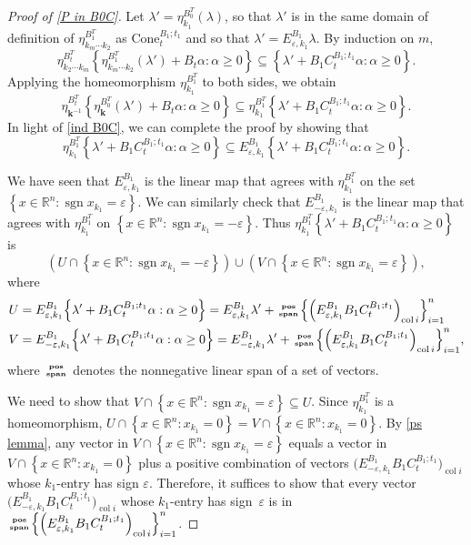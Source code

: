 \documentclass{amsart}
\theoremstyle{definition}
\theoremstyle{remark}
\numberwithin{equation}{section}
\newcommand{\reals}{\mathbb R}
\newcommand{\ep}{\varepsilon}
\newcommand{\col}{\operatorname{col}}
\newcommand{\sgn}{\operatorname{sgn}}
\newcommand{\posspan}{\!\!\tiny\begin{array}{c}\mathbf{pos}\\\mathbf{span}\end{array}\!\!}
\newcommand{\set}[1]{{\left\lbrace #1 \right\rbrace}}
\newcommand{\0}{{\mathbf{0}}}
\newcommand{\Cone}{\mathrm{Cone}}
\newcommand{\kk}{\mathbf{k}}
\begin{document}
\begin{proof}[Proof of \cref{P in B0C}]
Let $\lambda'=\eta_{k_1}^{B_0^T}(\lambda)$, so that $\lambda'$ is in the same domain of definition of $\eta_{k_m\cdots k_2}^{B_1^T}$ as $\Cone_t^{B_1;t_1}$ and so that $\lambda'=E^{B_1}_{\ep,k_1}\lambda$.
By induction on $m$, 
\[\eta_{k_2\cdots k_m}^{B_t^T}\set{\eta_{k_m\cdots k_2}^{B_1^T}(\lambda')+B_t\alpha:\alpha\ge0}\subseteq\set{\lambda'+B_1C_t^{B_1;t_1}\alpha:\alpha\ge0}.\]
Applying the homeomorphism $\eta_{k_1}^{B_1^T}$ to both sides, we obtain
\[\eta_{\kk^{-1}}^{B_t^T}\set{\eta_\kk^{B_0^T}(\lambda')+B_t\alpha:\alpha\ge0}\subseteq\eta_{k_1}^{B_1^T}\set{\lambda'+B_1C_t^{B_1;t_1}\alpha:\alpha\ge0}.\]
In light of \eqref{ind B0C}, we can complete the proof by showing that
\[\eta_{k_1}^{B_1^T}\set{\lambda'+B_1C_t^{B_1;t_1}\alpha:\alpha\ge0}\subseteq E^{B_1}_{\ep,k_1}\set{\lambda'+B_1C_t^{B_1;t_1}\alpha:\alpha\ge0}.\]

We have seen that $E^{B_1}_{\ep,k_1}$ is the linear map that agrees with $\eta_{k_1}^{B_1^T}$ on the set $\set{x\in\reals^n:\sgn x_{k_1}=\ep}$.
We can similarly check that $E^{B_1}_{-\ep,k_1}$ is the linear map that agrees with $\eta_{k_1}^{B_1^T}$ on $\set{x\in\reals^n:\sgn x_{k_1}=-\ep}$.
Thus $\eta_{k_1}^{B_1^T}\set{\lambda'+B_1C_t^{B_1;t_1}\alpha:\alpha\ge0}$ is
\[(U\cap\set{x\in\reals^n:\sgn x_{k_1}=-\ep})\cup(V\cap\set{x\in\reals^n:\sgn x_{k_1}=\ep}),\]
where 
{\small
\begin{align*}
U&=E^{B_1}_{\ep,k_1}\set{\lambda'+B_1C_t^{B_1;t_1}\alpha:\alpha\ge0}=E^{B_1}_{\ep,k_1}\lambda'+\posspan\set{\left(E^{B_1}_{\ep,k_1}B_1C_t^{B_1;t_1}\right)_{\col i}}_{i=1}^n\\
V&=E^{B_1}_{-\ep,k_1}\set{\lambda'+B_1C_t^{B_1;t_1}\alpha:\alpha\ge0}=E^{B_1}_{-\ep,k_1}\lambda'+\posspan\set{\left(E^{B_1}_{\ep,k_1}B_1C_t^{B_1;t_1}\right)_{\col i}}_{i=1}^n,
\end{align*}
}
where $\posspan$ denotes the nonnegative linear span of a set of vectors.

We need to show that $V\cap\set{x\in\reals^n:\sgn x_{k_1}=\ep}\subseteq U$.
Since $\eta_{k_1}^{B_1^T}$ is a homeomorphism, $U\cap\set{x\in\reals^n:x_{k_1}=0}=V\cap\set{x\in\reals^n:x_{k_1}=0}$.
By \cref{ps lemma}, any vector in $V\cap\set{x\in\reals^n:\sgn x_{k_1}=\ep}$ equals a vector in $V\cap\set{x\in\reals^n:x_{k_1}=0}$ plus a positive combination of vectors $\bigl(E^{B_1}_{-\ep,k_1}B_1C_t^{B_1;t_1}\bigr)_{\col i}$ whose $k_1$-entry has sign $\ep$.
Therefore, it suffices to show that every vector $\bigl(E^{B_1}_{-\ep,k_1}B_1C_t^{B_1;t_1}\bigr)_{\col i}$ whose $k_1$-entry has sign~$\ep$ is in $\posspan\set{\left(E^{B_1}_{\ep,k_1}B_1C_t^{B_1;t_1}\right)_{\col i}}_{i=1}^n$.


\end{proof}
\end{document}
